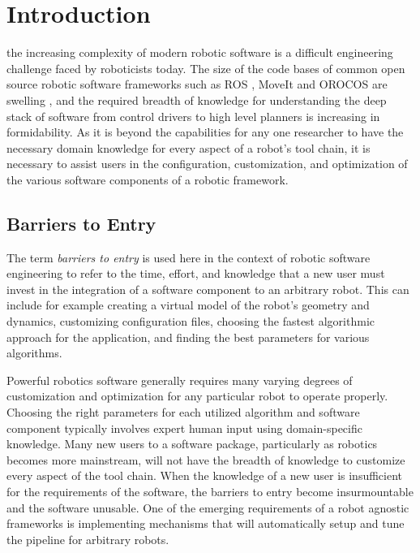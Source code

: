 \documentclass[10pt,journal,compsoc]{joser1}
\begin{document}
\section{Introduction}
 {the increasing complexity of modern robotic software is a difficult engineering challenge faced by roboticists today. The size of the code bases of common open source robotic software frameworks such as ROS \cite{quigley2009ros}, MoveIt \cite{MoveIt} and OROCOS \cite{bruyninckx2001open} are swelling \cite{makarenko2007benefits}, and the required breadth of knowledge for understanding the deep stack of software from control drivers to high level planners is increasing in formidability. As it is beyond the capabilities for any one researcher to have the necessary domain knowledge for every aspect of a robot's tool chain, it is necessary to assist users in the configuration, customization, and optimization of the various software components of a robotic framework. 

\subsection{Barriers to Entry}

The term \textit{barriers to entry} is used here in the context of robotic software engineering to refer to the time, effort, and knowledge that a new user must invest in the integration of a software component to an arbitrary robot. This can include for example creating a virtual model of the robot's geometry and dynamics, customizing configuration files, choosing the fastest algorithmic approach for the application, and finding the best parameters for various algorithms. 

Powerful robotics software generally requires many varying degrees of customization and optimization for any particular robot to operate properly. Choosing the right parameters for each utilized algorithm and software component typically involves expert human input using domain-specific knowledge. Many new users to a software package, particularly as robotics becomes more mainstream, will not have the breadth of knowledge to customize every aspect of the tool chain. When the knowledge of a new user is insufficient for the requirements of the software, the barriers to entry become insurmountable and the software unusable. One of the emerging requirements of a robot agnostic frameworks is implementing mechanisms that will automatically setup and tune the pipeline for arbitrary robots.

}
\end{document}
